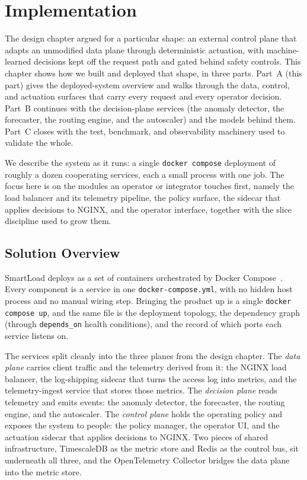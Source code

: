 \chapter{Implementation}
\label{ch:impl_overview}

The design chapter argued for a particular shape: an external control plane that
adapts an unmodified data plane through deterministic actuation, with
machine-learned decisions kept off the request path and gated behind safety
controls. This chapter shows how we built and deployed that shape, in three parts.
Part~A (this part) gives the deployed-system overview and walks through the data,
control, and actuation surfaces that carry every request and every operator
decision. Part~B continues with the decision-plane services (the anomaly detector,
the forecaster, the routing engine, and the autoscaler) and the models behind
them. Part~C closes with the test, benchmark, and observability machinery used to
validate the whole.

We describe the system as it runs: a single \texttt{docker compose} deployment of
roughly a dozen cooperating services, each a small process with one job. The focus
here is on the modules an operator or integrator touches first, namely the load
balancer and its telemetry pipeline, the policy surface, the sidecar that applies
decisions to NGINX, and the operator interface, together with the slice discipline
used to grow them.

\section{Solution Overview}
\label{sec:ima:overview}

SmartLoad deploys as a set of containers orchestrated by Docker
Compose~\cite{merkel2014docker}. Every component is a service in one
\texttt{docker-compose.yml}, with no hidden host process and no manual wiring
step. Bringing the product up is a single \texttt{docker compose up}, and the same
file is the deployment topology, the dependency graph (through \texttt{depends\_on}
health conditions), and the record of which ports each service listens on.

The services split cleanly into the three planes from the design chapter. The
\emph{data plane} carries client traffic and the telemetry derived from it: the
NGINX load balancer, the log-shipping sidecar that turns the access log into
metrics, and the telemetry-ingest service that stores those metrics. The
\emph{decision plane} reads telemetry and emits events: the anomaly detector, the
forecaster, the routing engine, and the autoscaler. The \emph{control plane} holds
the operating policy and exposes the system to people: the policy manager, the
operator UI, and the actuation sidecar that applies decisions to NGINX. Two pieces
of shared infrastructure, TimescaleDB as the metric store and Redis as the control
bus, sit underneath all three, and the OpenTelemetry Collector bridges the data
plane into the metric store.

